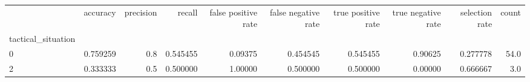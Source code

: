 \begin{tabular}{lrrrrrrrrr}
\toprule
{} &  accuracy &  precision &    recall &  false positive rate &  false negative rate &  true positive rate &  true negative rate &  selection rate &  count \\
tactical\_situation &           &            &           &                      &                      &                     &                     &                 &        \\
\midrule
0                  &  0.759259 &        0.8 &  0.545455 &              0.09375 &             0.454545 &            0.545455 &             0.90625 &        0.277778 &   54.0 \\
2                  &  0.333333 &        0.5 &  0.500000 &              1.00000 &             0.500000 &            0.500000 &             0.00000 &        0.666667 &    3.0 \\
\bottomrule
\end{tabular}
